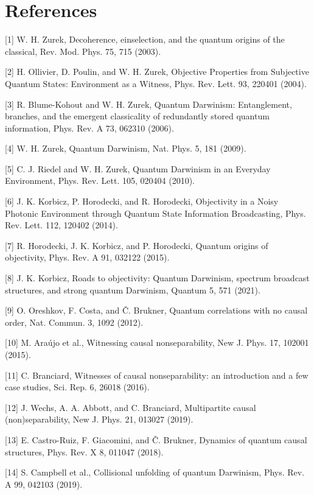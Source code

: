 \documentclass[
]{article}
\begin{document}
\section{References}\label{references}

{[}1{]} W. H. Zurek, Decoherence, einselection, and the quantum origins
of the classical, Rev. Mod. Phys. 75, 715 (2003).

{[}2{]} H. Ollivier, D. Poulin, and W. H. Zurek, Objective Properties
from Subjective Quantum States: Environment as a Witness, Phys. Rev.
Lett. 93, 220401 (2004).

{[}3{]} R. Blume-Kohout and W. H. Zurek, Quantum Darwinism:
Entanglement, branches, and the emergent classicality of redundantly
stored quantum information, Phys. Rev. A 73, 062310 (2006).

{[}4{]} W. H. Zurek, Quantum Darwinism, Nat. Phys. 5, 181 (2009).

{[}5{]} C. J. Riedel and W. H. Zurek, Quantum Darwinism in an Everyday
Environment, Phys. Rev. Lett. 105, 020404 (2010).

{[}6{]} J. K. Korbicz, P. Horodecki, and R. Horodecki, Objectivity in a
Noisy Photonic Environment through Quantum State Information
Broadcasting, Phys. Rev. Lett. 112, 120402 (2014).

{[}7{]} R. Horodecki, J. K. Korbicz, and P. Horodecki, Quantum origins
of objectivity, Phys. Rev. A 91, 032122 (2015).

{[}8{]} J. K. Korbicz, Roads to objectivity: Quantum Darwinism, spectrum
broadcast structures, and strong quantum Darwinism, Quantum 5, 571
(2021).

{[}9{]} O. Oreshkov, F. Costa, and Č. Brukner, Quantum correlations with
no causal order, Nat. Commun. 3, 1092 (2012).

{[}10{]} M. Araújo et al., Witnessing causal nonseparability, New J.
Phys. 17, 102001 (2015).

{[}11{]} C. Branciard, Witnesses of causal nonseparability: an
introduction and a few case studies, Sci. Rep. 6, 26018 (2016).

{[}12{]} J. Wechs, A. A. Abbott, and C. Branciard, Multipartite causal
(non)separability, New J. Phys. 21, 013027 (2019).

{[}13{]} E. Castro-Ruiz, F. Giacomini, and Č. Brukner, Dynamics of
quantum causal structures, Phys. Rev. X 8, 011047 (2018).

{[}14{]} S. Campbell et al., Collisional unfolding of quantum Darwinism,
Phys. Rev. A 99, 042103 (2019).
\end{document}
